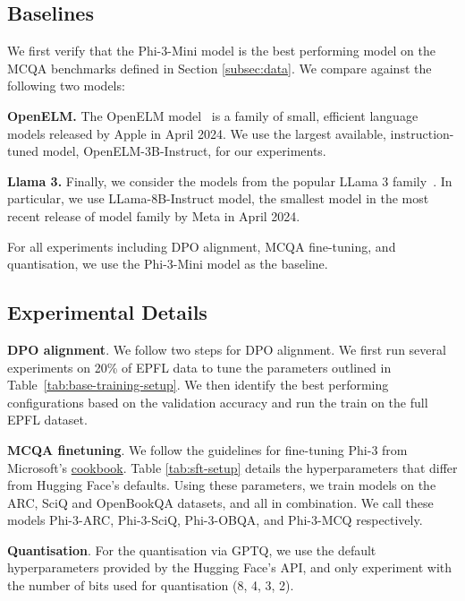 \subsection{Baselines}\label{subsec:baselines}

We first verify that the Phi-3-Mini model is the best performing model on the MCQA benchmarks defined in Section \ref{subsec:data}. We compare against the following two models:

\textbf{OpenELM.} The OpenELM model~\cite{openelm} is a family of small, efficient language models released by Apple in April 2024. We use the largest available, instruction-tuned model, OpenELM-3B-Instruct, for our experiments.

\textbf{Llama 3.} Finally, we consider the models from the popular LLama 3 family~\cite{llama}. In particular, we use LLama-8B-Instruct model, the smallest model in the most recent release of model family by Meta in April 2024.

For all experiments including DPO alignment, MCQA fine-tuning, and quantisation, we use the Phi-3-Mini model as the baseline.

\subsection{Experimental Details}
\label{subsec:experimental-details}


\textbf{DPO alignment}. We follow two steps for DPO alignment. We first run several experiments on 20\% of EPFL data to tune the parameters outlined in Table~\ref{tab:base-training-setup}. We then identify the best performing configurations based on the validation accuracy and run the train on the full EPFL dataset.

\textbf{MCQA finetuning}. We follow the guidelines for fine-tuning Phi-3 from Microsoft's \href{https://github.com/microsoft/Phi-3CookBook}{cookbook}. Table \ref{tab:sft-setup} details the hyperparameters that differ from Hugging Face's defaults. Using these parameters, we train models on the ARC, SciQ and OpenBookQA datasets, and all in combination. We call these models Phi-3-ARC, Phi-3-SciQ, Phi-3-OBQA, and Phi-3-MCQ respectively.

\textbf{Quantisation}. For the quantisation via GPTQ, we use the default hyperparameters provided by the Hugging Face's API, and only experiment with the number of bits used for quantisation (8, 4, 3, 2).

